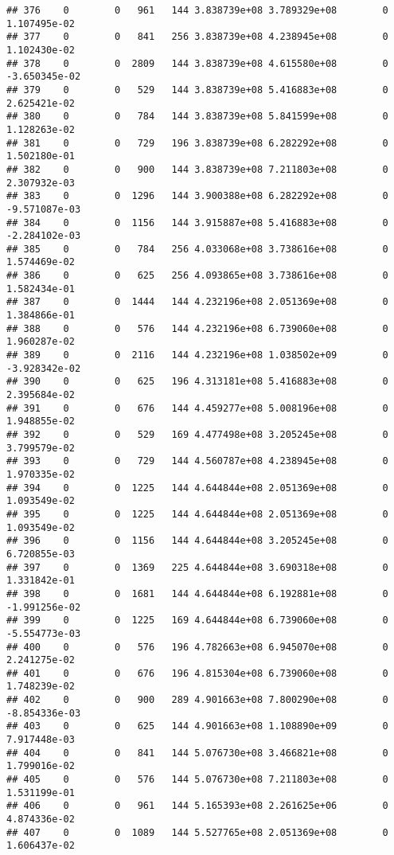 \documentclass[
]{article}
\begin{document}
\begin{enumerate}
\begin{verbatim}
## 376    0        0   961   144 3.838739e+08 3.789329e+08        0  1.107495e-02
## 377    0        0   841   256 3.838739e+08 4.238945e+08        0  1.102430e-02
## 378    0        0  2809   144 3.838739e+08 4.615580e+08        0 -3.650345e-02
## 379    0        0   529   144 3.838739e+08 5.416883e+08        0  2.625421e-02
## 380    0        0   784   144 3.838739e+08 5.841599e+08        0  1.128263e-02
## 381    0        0   729   196 3.838739e+08 6.282292e+08        0  1.502180e-01
## 382    0        0   900   144 3.838739e+08 7.211803e+08        0  2.307932e-03
## 383    0        0  1296   144 3.900388e+08 6.282292e+08        0 -9.571087e-03
## 384    0        0  1156   144 3.915887e+08 5.416883e+08        0 -2.284102e-03
## 385    0        0   784   256 4.033068e+08 3.738616e+08        0  1.574469e-02
## 386    0        0   625   256 4.093865e+08 3.738616e+08        0  1.582434e-01
## 387    0        0  1444   144 4.232196e+08 2.051369e+08        0  1.384866e-01
## 388    0        0   576   144 4.232196e+08 6.739060e+08        0  1.960287e-02
## 389    0        0  2116   144 4.232196e+08 1.038502e+09        0 -3.928342e-02
## 390    0        0   625   196 4.313181e+08 5.416883e+08        0  2.395684e-02
## 391    0        0   676   144 4.459277e+08 5.008196e+08        0  1.948855e-02
## 392    0        0   529   169 4.477498e+08 3.205245e+08        0  3.799579e-02
## 393    0        0   729   144 4.560787e+08 4.238945e+08        0  1.970335e-02
## 394    0        0  1225   144 4.644844e+08 2.051369e+08        0  1.093549e-02
## 395    0        0  1225   144 4.644844e+08 2.051369e+08        0  1.093549e-02
## 396    0        0  1156   144 4.644844e+08 3.205245e+08        0  6.720855e-03
## 397    0        0  1369   225 4.644844e+08 3.690318e+08        0  1.331842e-01
## 398    0        0  1681   144 4.644844e+08 6.192881e+08        0 -1.991256e-02
## 399    0        0  1225   169 4.644844e+08 6.739060e+08        0 -5.554773e-03
## 400    0        0   576   196 4.782663e+08 6.945070e+08        0  2.241275e-02
## 401    0        0   676   196 4.815304e+08 6.739060e+08        0  1.748239e-02
## 402    0        0   900   289 4.901663e+08 7.800290e+08        0 -8.854336e-03
## 403    0        0   625   144 4.901663e+08 1.108890e+09        0  7.917448e-03
## 404    0        0   841   144 5.076730e+08 3.466821e+08        0  1.799016e-02
## 405    0        0   576   144 5.076730e+08 7.211803e+08        0  1.531199e-01
## 406    0        0   961   144 5.165393e+08 2.261625e+06        0  4.874336e-02
## 407    0        0  1089   144 5.527765e+08 2.051369e+08        0  1.606437e-02

\end{verbatim}
\end{enumerate}
\end{document}
